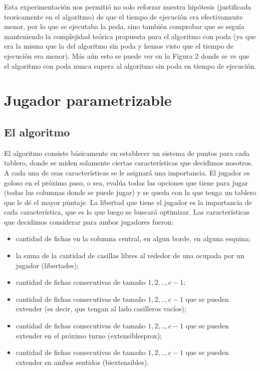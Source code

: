 \documentclass[A4paper,oneside,fleqn,11pt]{article}
\theoremstyle{definition}
\begin{document}
Esta experimentación nos permitió no solo reforzar nuestra hipótesis (justificada teoricamente en el algoritmo) de que el tiempo de ejecución era efectivamente menor, por lo que se ejecutaba la poda, sino también comprobar que se seguía manteniendo la complejidad teórica propuesta para el algoritmo con poda (ya que era la misma que la del algoritmo sin poda y hemos visto que el tiempo de ejecución era menor). Más aún esto se puede ver en la Figura 2 donde se ve que el algoritmo con poda nunca supera al algoritmo sin poda en tiempo de ejecución.



















\section{Jugador parametrizable}


\subsection{El algoritmo}
El algoritmo consiste básicamente en establecer un sistema de puntos para cada tablero, donde se miden solamente ciertas características que decidimos nosotros. A cada una de esas características se le asignará una importancia. El jugador es goloso en el próximo paso, o sea, evalúa todas las opciones que tiene para jugar (todas las columnas donde se puede jugar) y se queda con la que tenga un tablero que le dé el mayor puntaje. La libertad que tiene el jugador es la importancia de cada característica, que es lo que luego se buscará optimizar. Las características que decidimos considerar para ambos jugadores fueron:

\begin{itemize}
\item cantidad de fichas en la columna central, en algun borde, en alguna esquina;
\item la suma de la cantidad de casillas libres al rededor de una ocupada por un jugador (libertades);
\item cantidad de fichas consecutivas de tamaño $1,2,..,c-1$;
\item cantidad de fichas consecutivas de tamaño $1,2,..,c-1$ que se pueden extender (es decir, que tengan al lado casilleros vacíos); 
\item cantidad de fichas consecutivas de tamaño $1,2,..,c-1$ que se pueden extender en el próximo turno (extensiblesprox);
\item cantidad de fichas consecutivas de tamaño $1,2,..,c-1$ que se pueden extender en ambos sentidos (biextensibles).
\end{itemize}
\end{document}
